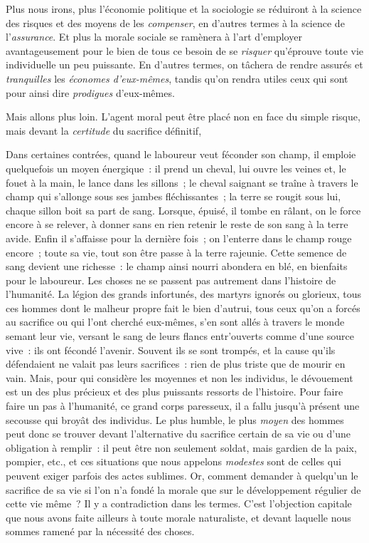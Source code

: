 \documentclass[french,twoside]{book} %
\begin{document}
Plus nous irons, plus l’économie politique et la sociologie se réduiront à la science des risques et des moyens de les \emph{compenser}, en d’autres termes à la science de l’\emph{assurance}. Et plus la morale sociale se ramènera à l’art d’employer avantageusement pour le bien de tous ce besoin de se \emph{risquer} qu’éprouve toute vie individuelle un peu puissante. En d’autres termes, on tâchera de rendre assurés et \emph{tranquilles} les \emph{économes d’eux-mêmes}, tandis qu’on rendra utiles ceux qui sont pour ainsi dire \emph{prodigues} d’eux-mêmes.\par
Mais allons plus loin. L’agent moral peut être placé non en face du simple risque, mais devant la \emph{certitude} du sacrifice définitif,\par
Dans certaines contrées, quand le laboureur veut féconder son champ, il emploie quelquefois un moyen énergique : il prend un cheval, lui ouvre les veines et, le fouet à la main, le lance dans les sillons ; le cheval saignant se traîne à travers le champ qui s’allonge sous ses jambes fléchissantes ; la terre se rougit sous lui, chaque sillon boit sa part de sang. Lorsque, épuisé, il tombe en râlant, on le force encore à se relever, à donner sans en rien retenir le reste de son sang à la terre avide. Enfin il s’affaisse pour la dernière fois ; on l’enterre dans le champ rouge encore ; toute sa vie, tout son être passe à la terre rajeunie. Cette semence de sang devient une richesse : le champ ainsi nourri abondera en blé, en bienfaits pour le laboureur. Les choses ne se passent pas autrement dans l’histoire de l’humanité. La légion des grands infortunés, des martyrs ignorés ou glorieux, tous ces hommes dont le malheur propre fait le bien d’autrui, tous ceux qu’on a forcés au sacrifice ou qui l’ont cherché eux-mêmes, s’en sont allés à travers le monde semant leur vie, versant le sang de leurs flancs entr’ouverts comme d’une source vive : ils ont fécondé l’avenir. Souvent ils se sont trompés, et la cause qu’ils défendaient ne valait pas leurs sacrifices : rien de plus triste que de mourir en vain. Mais, pour qui considère les moyennes et non les individus, le dévouement est un des plus précieux et des plus puissants ressorts de l’histoire. Pour faire faire un pas à l’humanité, ce grand corps paresseux, il a fallu jusqu’à présent une secousse qui broyât des individus. Le plus humble, le plus \emph{moyen} des hommes peut donc se trouver devant l’alternative du sacrifice certain de sa vie ou d’une obligation à remplir : il peut être non seulement soldat, mais gardien de la paix, pompier, etc., et ces situations que nous appelons \emph{modestes} sont de celles qui peuvent exiger parfois des actes sublimes. Or, comment demander à quelqu’un le sacrifice de sa vie si l’on n’a fondé la morale que sur le développement régulier de cette vie même ? Il y a contradiction dans les termes. C’est l’objection capitale que nous avons faite ailleurs à toute morale naturaliste, et devant laquelle nous sommes ramené par la nécessité des choses.\par
\end{document}
